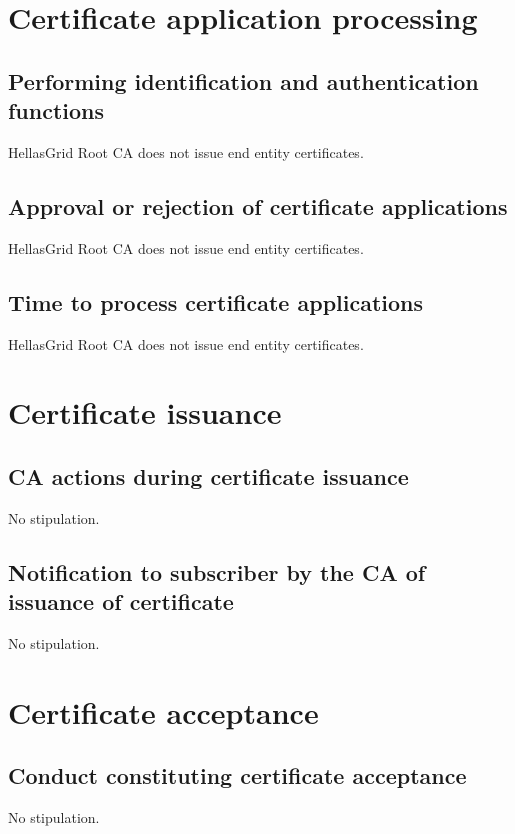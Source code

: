 \documentclass[11pt,a4paper,titlepage]{book}
\begin{document}
\section{Certificate application processing}
\subsection{Performing identification and authentication functions}

HellasGrid Root CA does not issue end entity certificates.

\subsection{Approval or rejection of certificate applications}

HellasGrid Root CA does not issue end entity certificates.

\subsection{Time to process certificate applications}

HellasGrid Root CA does not issue end entity certificates.

\section{Certificate issuance}
\subsection{CA actions during certificate issuance}

No stipulation.

\subsection{Notification to subscriber by the CA of issuance of certificate}

No stipulation.

\section{Certificate acceptance}
\subsection{Conduct constituting certificate acceptance}

No stipulation.
\end{document}
